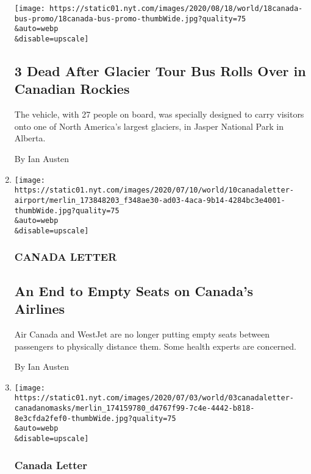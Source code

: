 \begin{enumerate}
  \texttt{[image: https://static01.nyt.com/images/2020/08/18/world/18canada-bus-promo/18canada-bus-promo-thumbWide.jpg?quality=75\\\&auto=webp\\\&disable=upscale]}

  \hypertarget{3-dead-after-glacier-tour-bus-rolls-over-in-canadian-rockies}{%
  \subsection{3 Dead After Glacier Tour Bus Rolls Over in Canadian
  Rockies}\label{3-dead-after-glacier-tour-bus-rolls-over-in-canadian-rockies}}

  The vehicle, with 27 people on board, was specially designed to carry
  visitors onto one of North America's largest glaciers, in Jasper
  National Park in Alberta.

  By Ian Austen
\item
  \href{/2020/07/10/world/canada/canada-airlines-coronavirus.html}{}

  \texttt{[image: https://static01.nyt.com/images/2020/07/10/world/10canadaletter-airport/merlin\_173848203\_f348ae30-ad03-4aca-9b14-4284bc3e4001-thumbWide.jpg?quality=75\\\&auto=webp\\\&disable=upscale]}

  \hypertarget{canada-letter-2}{%
  \subsubsection{CANADA LETTER}\label{canada-letter-2}}

  \hypertarget{an-end-to-empty-seats-on-canadas-airlines}{%
  \subsection{An End to Empty Seats on Canada's
  Airlines}\label{an-end-to-empty-seats-on-canadas-airlines}}

  Air Canada and WestJet are no longer putting empty seats between
  passengers to physically distance them. Some health experts are
  concerned.

  By Ian Austen
\item
  \href{/2020/07/03/world/canada/sorting-out-canadas-patchwork-of-face-mask-rules.html}{}

  \texttt{[image: https://static01.nyt.com/images/2020/07/03/world/03canadaletter-canadanomasks/merlin\_174159780\_d4767f99-7c4e-4442-b818-8e3cfda2fef0-thumbWide.jpg?quality=75\\\&auto=webp\\\&disable=upscale]}

  \hypertarget{canada-letter-3}{%
  \subsubsection{Canada Letter}\label{canada-letter-3}}


\end{enumerate}
